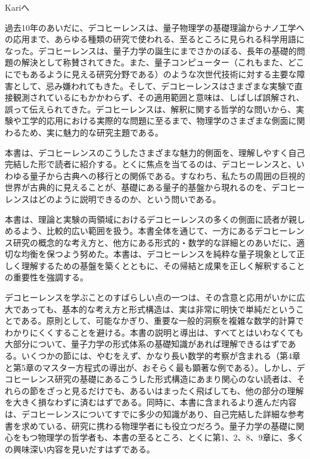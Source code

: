 \clearpage
\thispagestyle{empty}
\vspace*{.25\textheight}
\begin{center}\large Kariへ\end{center}
\clearpage
{}

過去10年のあいだに、デコヒーレンスは、量子物理学の基礎理論からナノ工学への応用まで、あらゆる種類の研究で使われる、至るところに見られる科学用語になった。デコヒーレンスは、量子力学の誕生にまでさかのぼる、長年の基礎的問題の解決として称賛されてきた。また、量子コンピューター（これもまた、どこにでもあるように見える研究分野である）のような次世代技術に対する主要な障害として、忌み嫌われてもきた。そして、デコヒーレンスはさまざまな実験で直接観測されているにもかかわらず、その適用範囲と意味は、しばしば誤解され、誤って伝えられてきた。デコヒーレンスは、解釈に関する哲学的な問いから、実験や工学的応用における実際的な問題に至るまで、物理学のさまざまな側面に関わるため、実に魅力的な研究主題である。

本書は、デコヒーレンスのこうしたさまざまな魅力的側面を、理解しやすく自己完結した形で読者に紹介する。とくに焦点を当てるのは、デコヒーレンスと、いわゆる量子から古典への移行との関係である。すなわち、私たちの周囲の巨視的世界が古典的に見えることが、基礎にある量子的基盤から現れるのを、デコヒーレンスはどのように説明できるのか、という問いである。

本書は、理論と実験の両領域におけるデコヒーレンスの多くの側面に読者が親しめるよう、比較的広い範囲を扱う。本書全体を通じて、一方にあるデコヒーレンス研究の概念的な考え方と、他方にある形式的・数学的な詳細とのあいだに、適切な均衡を保つよう努めた。本書は、デコヒーレンスを純粋な量子現象として正しく理解するための基盤を築くとともに、その帰結と成果を正しく解釈することの重要性を強調する。

デコヒーレンスを学ぶことのすばらしい点の一つは、その含意と応用がいかに広大であっても、基本的な考え方と形式構造は、実は非常に明快で単純だということである。原則として、可能なかぎり、重要な一般的洞察を複雑な数学的計算でわかりにくくすることを避ける。本書の説明と導出は、すべてとはいわなくても大部分について、量子力学の形式体系の基礎知識があれば理解できるはずである。いくつかの節には、やむをえず、かなり長い数学的考察が含まれる（第4章と第5章のマスター方程式の導出が、おそらく最も顕著な例である）。しかし、デコヒーレンス研究の基礎にあるこうした形式構造にあまり関心のない読者は、それらの節をざっと見るだけでも、あるいはまったく飛ばしても、他の部分の理解を大きく損なわずに済むはずである。同時に、本書に含まれるより進んだ内容は、デコヒーレンスについてすでに多少の知識があり、自己完結した詳細な参考書を求めている、研究に携わる物理学者にも役立つだろう。量子力学の基礎に関心をもつ物理学の哲学者も、本書の至るところ、とくに第1、2、8、9章に、多くの興味深い内容を見いだすはずである。

